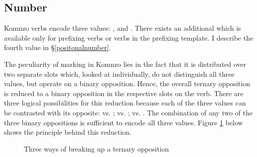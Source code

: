 \subsection{Number} \label{numbersubsec}

Komnzo verbs encode three  values: ,  and . There exists an additional  which is available only for prefixing verbs or verbs in the prefixing template. I describe the fourth  value in \S{}\ref{positonalnumber}.%

The peculiarity of  marking in Komnzo lies in the fact that it is distributed over two separate slots which, looked at individually, do not distinguish all three values, but operate on a binary opposition. Hence, the overall ternary  opposition is reduced to a binary opposition in the respective slots on the verb. There are three logical possibilities for this reduction because each of the three  values can be contrasted with its opposite:  vs. ;  vs. ;  vs. . The combination of any two of the three binary oppositions is sufficient to encode all three  values. Figure \ref{ternbinary} below shows the principle behind this reduction.

\begin{figure}
\caption{Three ways of breaking up a ternary opposition}\label{ternbinary}
\end{figure}%

